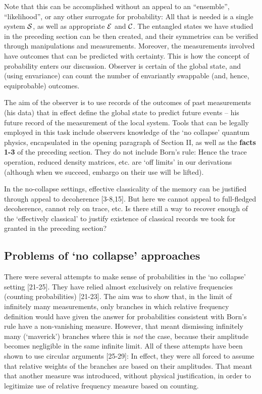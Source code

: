 \documentclass[aps,twocolumn,pra,epsfig]{revtex4}
\begin{document}
Note that this can be accomplished without an appeal to an ``ensemble'',
``likelihood'',  or any other surrogate for probability: All that is needed is a
single system $\cal S$, as well as appropriate ${\cal E}$ and ${\cal C}$.
The entangled states we have studied in the preceding section can be then 
created, and their symmetries can be verified through manipulations and 
measurements. Moreover, the measurements involved have outcomes that 
can be predicted with certainty. This is how the concept of probability enters 
our discussion. Observer is certain of the global state, and (using envariance)
can count the number of envariantly swappable (and, hence, equiprobable)
outcomes.
 
The aim of the observer is to use records of the outcomes of past measurements
(his data) that in effect define the global state to predict future events -- his future 
record of the measurement of the local system. Tools that can be
legally employed in this task include observers knowledge of the `no collapse'
quantum physics, encapsulated in the opening paragraph of Section II, as well as
the {\bf facts 1-3} of the preceding section. They do not include Born's rule:
Hence the trace operation, reduced density matrices, etc. are `off limits' in our
derivations (although when we succeed, embargo on their use will be lifted).

In the no-collapse settings, effective classicality of the memory can be
justified through appeal to decoherence [3-8,15]. But here we cannot appeal to
full-fledged decoherence, cannot rely on trace, etc. Is there still a way to
recover enough of the `effectively classical' to justify existence of
classical records we took for granted in the preceding section?


\subsection{Problems of `no collapse' approaches}

There were several attempts to make sense of probabilities in the `no collapse'
setting [21-25]. They have relied almost exclusively on relative frequencies
(counting probabilities) [21-23]. The aim was to show that, in the limit of
infinitely many measurements, only branches in which relative frequency 
definition would have given the answer for probabilities consistent with Born's rule 
have a non-vanishing measure. However, that meant dismissing infinitely many 
(`maverick') branches where this is {\it not} the case, because their amplitude
becomes negligible in the same infinite limit. All of these attempts have been
shown to use circular arguments [25-29]: In effect, they were all forced to
assume that relative weights of the branches are based on their amplitudes.
That meant that another measure was introduced, without physical justification,
in order to legitimize use of relative frequency measure based on counting.
\end{document}
